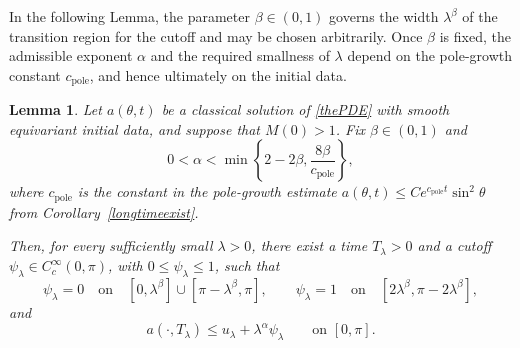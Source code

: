 \documentclass[11pt,a4paper]{article}
\numberwithin{equation}{section}
\theoremstyle{plain}
\newtheorem{lemma}[theorem]{Lemma}
\theoremstyle{remark}
\begin{document}
In the following Lemma, the parameter $\beta\in(0,1)$ governs the width $\lambda^\beta$ of
the transition region for the cutoff and may be chosen arbitrarily.
Once $\beta$ is fixed, the admissible exponent $\alpha$ and the
required smallness of $\lambda$ depend on the pole-growth constant
$c_{\mathrm{pole}}$, and hence ultimately on the initial data.


\begin{lemma}\label{perturbboundlem}
Let $a(\theta,t)$ be a classical solution of \eqref{thePDE} with
smooth equivariant initial data, and suppose that $M(0)>1$.
Fix $\beta\in(0,1)$ and
$$
0<\alpha<\min\left\{2-2\beta,\frac{8\beta}{c_{\mathrm{pole}}}\right\},
$$
where $c_{\mathrm{pole}}$ is the constant in the pole-growth estimate $a(\theta,t)\leq Ce^{c_{\mathrm{pole}}t}\sin^2\theta$ from Corollary~\ref{longtimeexist}. 

Then, for every sufficiently small $\lambda>0$, there exist a time
$T_\lambda>0$ and a cutoff $\psi_\lambda\in C_c^\infty(0,\pi)$,
with $0\leq\psi_\lambda\leq1$, such that
$$
\psi_\lambda=0
\quad\text{on}\quad
[0,\lambda^\beta]\cup[\pi-\lambda^\beta,\pi],
\qquad
\psi_\lambda=1
\quad\text{on}\quad
[2\lambda^\beta,\pi-2\lambda^\beta],
$$
and
$$
a(\cdot,T_\lambda)
\leq
u_\lambda+\lambda^\alpha\psi_\lambda
\qquad\text{on }[0,\pi].
$$
\end{lemma}
\end{document}
